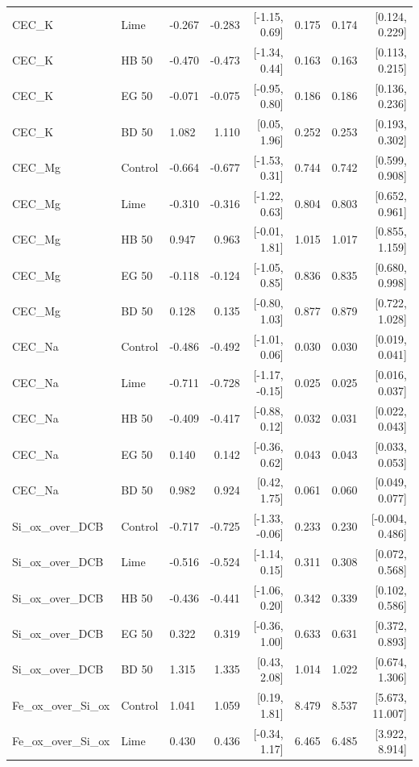 \documentclass[preprint,12pt]{elsarticle}
\begin{document}
\begin{landscape}
\begin{longtable}{lllrrrrr}
CEC\_K & Lime & -0.267 & -0.283 & [-1.15, 0.69] & 0.175 & 0.174 & [0.124, 0.229] \\
CEC\_K & HB 50 & -0.470 & -0.473 & [-1.34, 0.44] & 0.163 & 0.163 & [0.113, 0.215] \\
CEC\_K & EG 50 & -0.071 & -0.075 & [-0.95, 0.80] & 0.186 & 0.186 & [0.136, 0.236] \\
CEC\_K & BD 50 & 1.082 & 1.110 & [0.05, 1.96] & 0.252 & 0.253 & [0.193, 0.302] \\
CEC\_Mg & Control & -0.664 & -0.677 & [-1.53, 0.31] & 0.744 & 0.742 & [0.599, 0.908] \\
CEC\_Mg & Lime & -0.310 & -0.316 & [-1.22, 0.63] & 0.804 & 0.803 & [0.652, 0.961] \\
CEC\_Mg & HB 50 & 0.947 & 0.963 & [-0.01, 1.81] & 1.015 & 1.017 & [0.855, 1.159] \\
CEC\_Mg & EG 50 & -0.118 & -0.124 & [-1.05, 0.85] & 0.836 & 0.835 & [0.680, 0.998] \\
CEC\_Mg & BD 50 & 0.128 & 0.135 & [-0.80, 1.03] & 0.877 & 0.879 & [0.722, 1.028] \\
CEC\_Na & Control & -0.486 & -0.492 & [-1.01, 0.06] & 0.030 & 0.030 & [0.019, 0.041] \\
CEC\_Na & Lime & -0.711 & -0.728 & [-1.17, -0.15] & 0.025 & 0.025 & [0.016, 0.037] \\
CEC\_Na & HB 50 & -0.409 & -0.417 & [-0.88, 0.12] & 0.032 & 0.031 & [0.022, 0.043] \\
CEC\_Na & EG 50 & 0.140 & 0.142 & [-0.36, 0.62] & 0.043 & 0.043 & [0.033, 0.053] \\
CEC\_Na & BD 50 & 0.982 & 0.924 & [0.42, 1.75] & 0.061 & 0.060 & [0.049, 0.077] \\
Si\_ox\_over\_DCB & Control & -0.717 & -0.725 & [-1.33, -0.06] & 0.233 & 0.230 & [-0.004, 0.486] \\
Si\_ox\_over\_DCB & Lime & -0.516 & -0.524 & [-1.14, 0.15] & 0.311 & 0.308 & [0.072, 0.568] \\
Si\_ox\_over\_DCB & HB 50 & -0.436 & -0.441 & [-1.06, 0.20] & 0.342 & 0.339 & [0.102, 0.586] \\
Si\_ox\_over\_DCB & EG 50 & 0.322 & 0.319 & [-0.36, 1.00] & 0.633 & 0.631 & [0.372, 0.893] \\
Si\_ox\_over\_DCB & BD 50 & 1.315 & 1.335 & [0.43, 2.08] & 1.014 & 1.022 & [0.674, 1.306] \\
Fe\_ox\_over\_Si\_ox & Control & 1.041 & 1.059 & [0.19, 1.81] & 8.479 & 8.537 & [5.673, 11.007] \\
Fe\_ox\_over\_Si\_ox & Lime & 0.430 & 0.436 & [-0.34, 1.17] & 6.465 & 6.485 & [3.922, 8.914] \\

\end{longtable}
\end{landscape}
\end{document}
